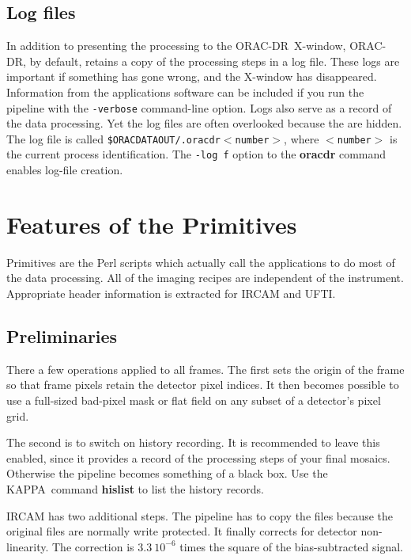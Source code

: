 \documentclass[twoside,11pt]{article}
\newcommand{\xref}[3]{#1}
\newcommand{\xlabel}[1]{}
\renewcommand{\_}{\texttt{\symbol{95}}}
\newcommand{\KAPPA}{{\footnotesize KAPPA}}
\newcommand{\ORACDR}{{\footnotesize ORAC-DR}}
\begin{document}
\subsection{\xlabel{log_files}Log files\label{log_files}}

In addition to presenting the processing to the \ORACDR\ X-window,
\ORACDR, by default, retains a copy of the processing steps in a log
file.  These logs are important if something has gone wrong, and the
X-window has disappeared.  Information from the applications software
can be included if you run the pipeline with the {\tt -verbose}
command-line option.  Logs also serve as a record of the data
processing.  Yet the log files are often overlooked because the are
hidden.  The log file is called
{\tt\$ORAC\_DATA\_OUT/.oracdr\_$<$number$>$}, where {\tt$<$number$>$} is
the current process identification.  The {\tt -log f} option to the
{\bf oracdr} command enables log-file creation.

\section{\xlabel{features_of_the_primitives}Features of the
Primitives\label{features_of_the_primitives}}

Primitives are the Perl scripts which actually call the applications
to do most of the data processing.  All of the imaging recipes are
independent of the instrument.  Appropriate header information is
extracted for IRCAM and UFTI.

\subsection{\xlabel{preliminaries}Preliminaries\label{preliminaries}}

There a few operations applied to all frames.  The first sets the
origin of the frame so that frame pixels retain the detector pixel
indices.  It then becomes possible to use a full-sized bad-pixel mask
or flat field on any subset of a detector's pixel grid.

The second is to switch on history recording.  It is recommended to
leave this enabled, since it provides a record of the processing steps
of your final mosaics.  Otherwise the pipeline becomes something of 
a black box.  Use the \KAPPA\ command
\xref{{\bf hislist}}{sun95}{HISLIST} to list the history records.

IRCAM has two additional steps.  The pipeline has to copy the files
because the original files are normally write protected.  It finally
corrects for detector non-linearity.  The correction is $3.3~10^{-6}$
times the square of the bias-subtracted signal. 
\end{document}
